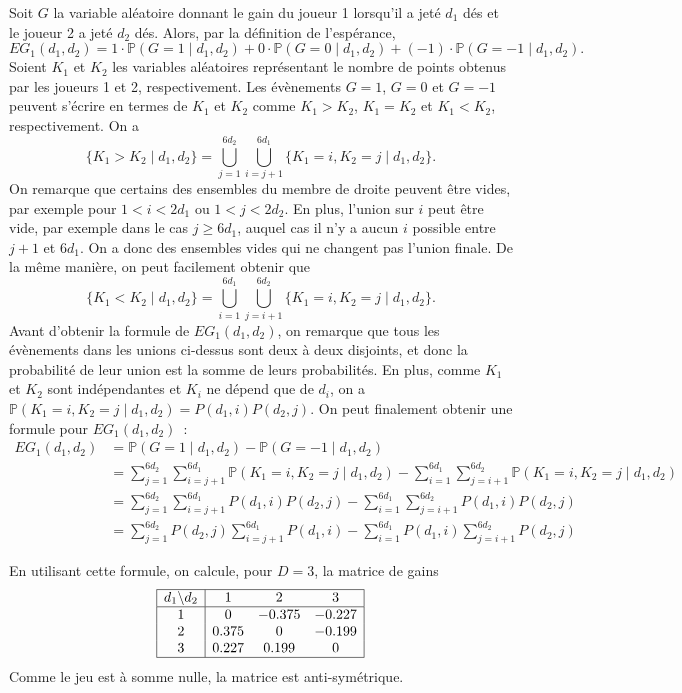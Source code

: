 \documentclass[a4paper,11pt]{amsart}
\theoremstyle{plain}
\begin{document}
Soit $G$ la variable aléatoire donnant le gain du joueur 1 lorsqu'il a jeté $d_1$ dés et le joueur 2 a jeté $d_2$ dés. Alors, par la définition de l'espérance,
\[
EG_1(d_1, d_2) = 1 \cdot \mathbb P(G = 1 \mid d_1, d_2) + 0 \cdot \mathbb P(G = 0 \mid d_1, d_2) + (-1) \cdot \mathbb P(G = -1 \mid d_1, d_2).
\]
Soient $K_1$ et $K_2$ les variables aléatoires représentant le nombre de points obtenus par les joueurs 1 et 2, respectivement. Les évènements $G = 1$, $G = 0$ et $G = -1$ peuvent s'écrire en termes de $K_1$ et $K_2$ comme $K_1 > K_2$, $K_1 = K_2$ et $K_1 < K_2$, respectivement. On a
\[
\{K_1 > K_2 \mid d_1, d_2\} = \bigcup_{j=1}^{6 d_2} \bigcup_{i = j+1}^{6 d_1} \{K_1 = i, K_2 = j \mid d_1, d_2\}.
\]
On remarque que certains des ensembles du membre de droite peuvent être vides, par exemple pour $1 < i < 2 d_1$ ou $1 < j < 2 d_2$. En plus, l'union sur $i$ peut être vide, par exemple dans le cas $j \geq 6 d_1$, auquel cas il n'y a aucun $i$ possible entre $j+1$ et $6 d_1$. On a donc des ensembles vides qui ne changent pas l'union finale. De la même manière, on peut facilement obtenir que
\[
\{K_1 < K_2 \mid d_1, d_2\} = \bigcup_{i=1}^{6 d_1} \bigcup_{j = i+1}^{6 d_2} \{K_1 = i, K_2 = j \mid d_1, d_2\}.
\]
Avant d'obtenir la formule de $EG_1(d_1, d_2)$, on remarque que tous les évènements dans les unions ci-dessus sont deux à deux disjoints, et donc la probabilité de leur union est la somme de leurs probabilités. En plus, comme $K_1$ et $K_2$ sont indépendantes et $K_i$ ne dépend que de $d_i$, on a $\mathbb P(K_1 = i, K_2 = j \mid d_1, d_2) = P(d_1, i) P(d_2, j)$. On peut finalement obtenir une formule pour $EG_1(d_1, d_2)$~:
\begin{align*}
EG_1(d_1, d_2) & = \mathbb P(G = 1 \mid d_1, d_2) - \mathbb P(G = -1 \mid d_1, d_2) \\
& = \sum_{j=1}^{6 d_2} \sum_{i = j+1}^{6 d_1} \mathbb P(K_1 = i, K_2 = j \mid d_1, d_2) - \sum_{i=1}^{6 d_1} \sum_{j = i+1}^{6 d_2} \mathbb P(K_1 = i, K_2 = j \mid d_1, d_2) \\
& = \sum_{j=1}^{6 d_2} \sum_{i = j+1}^{6 d_1} P(d_1, i) P(d_2, j) - \sum_{i=1}^{6 d_1} \sum_{j = i+1}^{6 d_2} P(d_1, i) P(d_2, j) \\
& = \sum_{j=1}^{6 d_2} P(d_2, j) \sum_{i = j+1}^{6 d_1} P(d_1, i) - \sum_{i=1}^{6 d_1} P(d_1, i) \sum_{j = i+1}^{6 d_2} P(d_2, j)
\end{align*}

En utilisant cette formule, on calcule, pour $D = 3$, la matrice de gains
\[
\begin{array}{|c|ccc|}
\hline
d_1 \backslash d_2 & 1 & 2 & 3 \\
\hline
1 & 0     & -0.375 & -0.227 \\
2 & 0.375 &  0     & -0.199 \\
3 & 0.227 &  0.199 &  0 \\
\hline
\end{array}
\]
Comme le jeu est à somme nulle, la matrice est anti-symétrique.
\end{document}
